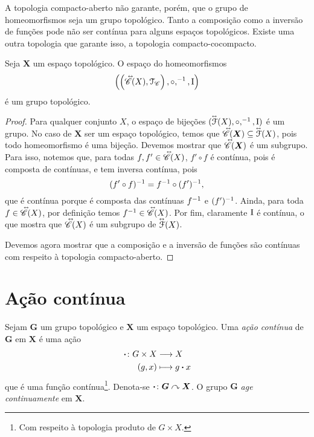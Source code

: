 A topologia compacto-aberto não garante, porém, que o grupo de homeomorfismos seja um grupo topológico. Tanto a composição como a inversão de funções pode não ser contínua para alguns espaços topológicos. Existe uma outra topologia que garante isso, a topologia compacto-cocompacto.


\begin{proposition}
Seja $\bm X$ um espaço topológico. O espaço do homeomorfismos
	\begin{equation*}
	\left( \left( \accentset{\leftrightarrow}{\mathscr{C}}(X),\mathcal{T}_{\mathscr{C}} \right),\circ,^{-1},\mathrm{I} \right)
	\end{equation*}
é um grupo topológico.
\end{proposition}
\begin{proof}
Para qualquer conjunto $X$, o espaço de bijeções $( \accentset{\leftrightarrow}{\mathcal F}(X),\circ,^{-1},\mathrm{I} )$ é um grupo. No caso de $\bm X$ ser um espaço topológico, temos que $\accentset{\leftrightarrow}{\mathscr{C}}(\bm X) \subseteq \accentset{\leftrightarrow}{\mathcal F}(X)$, pois todo homeomorfismo é uma bijeção. Devemos mostrar que $\accentset{\leftrightarrow}{\mathscr{C}}(\bm X)$ é um subgrupo. Para isso, notemos que, para todas $f,f' \in \accentset{\leftrightarrow}{\mathscr{C}}(X)$, $f' \circ f$ é contínua, pois é composta de contínuas, e tem inversa contínua, pois
	\begin{equation*}
	(f' \circ f)^{-1} = f^{-1} \circ (f')^{-1},
	\end{equation*}
que é contínua porque é composta das contínuas $f^{-1}$ e $(f')^{-1}$. Ainda, para toda $f \in \accentset{\leftrightarrow}{\mathscr{C}}(X)$, por definição temos $f^{-1} \in \accentset{\leftrightarrow}{\mathscr{C}}(X)$. Por fim, claramente $\mathrm{I}$ é contínua, o que mostra que $\accentset{\leftrightarrow}{\mathscr{C}}(X)$ é um subgrupo de $\accentset{\leftrightarrow}{\mathcal F}(X)$.

Devemos agora mostrar que a composição e a inversão de funções são contínuas com respeito à topologia compacto-aberto.
\end{proof}

\section{Ação contínua}

\begin{definition}
Sejam $\bm G$ um grupo topológico e $\bm X$ um espaço topológico. Uma \emph{ação contínua} de $\bm G$ em $\bm X$ é uma ação
	\begin{align*}
	{\bm{\cdot}}\colon {G \times X} &\longrightarrow {X} \\{(g,x)} &\longmapsto g \bm{\cdot} x
	\end{align*}
que é uma função contínua\footnote{Com respeito à topologia produto de $G \times X$.}. Denota-se $\bm{\cdot}\colon \bm G \curvearrowright \bm X$. O grupo $\bm G$ \emph{age continuamente} em $\bm X$.
\end{definition}

